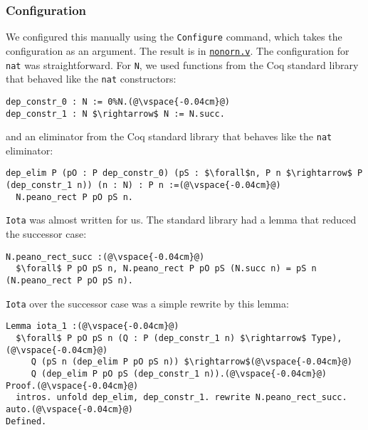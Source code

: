 \subsubsection{Configuration}
We configured this manually using the \lstinline{Configure} command,
which takes the configuration as an argument.
The result is in \href{https://github.com/uwplse/pumpkin-pi/blob/v2.0.0/plugin/coq/nonorn.v}{\lstinline{nonorn.v}}.
The configuration for \lstinline{nat} was straightforward.
For \lstinline{N}, we used functions from the Coq standard library that
behaved like the \lstinline{nat} constructors:

\begin{lstlisting}
dep_constr_0 : N := 0%N.(@\vspace{-0.04cm}@)
dep_constr_1 : N $\rightarrow$ N := N.succ.
\end{lstlisting}
and an eliminator from the Coq standard library that behaves like the \lstinline{nat} eliminator:

\begin{lstlisting}
dep_elim P (pO : P dep_constr_0) (pS : $\forall$n, P n $\rightarrow$ P (dep_constr_1 n)) (n : N) : P n :=(@\vspace{-0.04cm}@)
  N.peano_rect P pO pS n.
\end{lstlisting}
\lstinline{Iota} was almost written for us.
The standard library had a lemma that reduced the successor case:

\begin{lstlisting}
N.peano_rect_succ :(@\vspace{-0.04cm}@)
  $\forall$ P pO pS n, N.peano_rect P pO pS (N.succ n) = pS n (N.peano_rect P pO pS n).
\end{lstlisting}
\lstinline{Iota} over the successor case was a simple rewrite by this lemma:

\begin{lstlisting}
Lemma iota_1 :(@\vspace{-0.04cm}@)
  $\forall$ P pO pS n (Q : P (dep_constr_1 n) $\rightarrow$ Type),(@\vspace{-0.04cm}@)
     Q (pS n (dep_elim P pO pS n)) $\rightarrow$(@\vspace{-0.04cm}@)
     Q (dep_elim P pO pS (dep_constr_1 n)).(@\vspace{-0.04cm}@)
Proof.(@\vspace{-0.04cm}@)
  intros. unfold dep_elim, dep_constr_1. rewrite N.peano_rect_succ. auto.(@\vspace{-0.04cm}@)
Defined.
\end{lstlisting}

